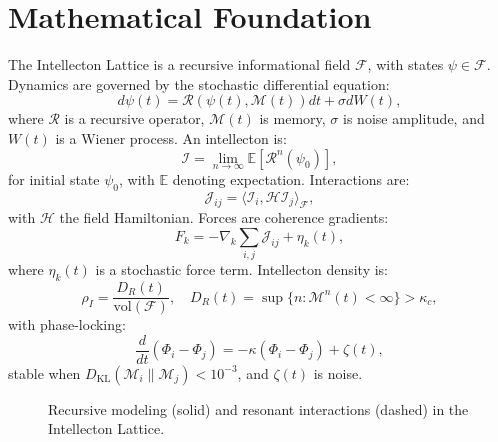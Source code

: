 \documentclass[11pt]{article}
\newcommand{\field}[1]{\mathcal{#1}}
\newcommand{\intellecton}{\mathcal{I}} %
\newcommand{\inner}[2]{\langle #1, #2 \rangle}
\newcommand{\dkl}{D_{\text{KL}}}
\begin{document}
\section{Mathematical Foundation}
\label{sec:math}
The Intellecton Lattice is a recursive informational field $\field{F}$, with states $\psi \in \field{F}$. Dynamics are governed by the stochastic differential equation:
\begin{equation}
d\psi(t) = \mathcal{R}(\psi(t), \mathcal{M}(t)) dt + \sigma dW(t),
\label{eq:field}
\end{equation}
where $\mathcal{R}$ is a recursive operator, $\mathcal{M}(t)$ is memory, $\sigma$ is noise amplitude, and $W(t)$ is a Wiener process. An intellecton is:
\begin{equation}
\intellecton = \lim_{n \to \infty} \mathbb{E}\left[\mathcal{R}^n(\psi_0)\right],
\label{eq:intellecton}
\end{equation}
for initial state $\psi_0$, with $\mathbb{E}$ denoting expectation. Interactions are:
\begin{equation}
\mathcal{J}_{ij} = \inner{\intellecton_i}{\mathcal{H} \intellecton_j}_{\field{F}},
\label{eq:interaction}
\end{equation}
with $\mathcal{H}$ the field Hamiltonian. Forces are coherence gradients:
\begin{equation}
F_k = -\nabla_k \sum_{i,j} \mathcal{J}_{ij} + \eta_k(t),
\label{eq:force_field}
\end{equation}
where $\eta_k(t)$ is a stochastic force term. Intellecton density is:
\begin{equation}
\rho_I = \frac{D_R(t)}{\text{vol}(\field{F})}, \quad D_R(t) = \sup \{ n : \mathcal{M}^n(t) < \infty \} > \kappa_c,
\label{eq:density}
\end{equation}
with phase-locking:
\begin{equation}
\frac{d}{dt} (\Phi_i - \Phi_j) = -\kappa (\Phi_i - \Phi_j) + \zeta(t),
\label{eq:phase}
\end{equation}
stable when $\dkl(\mathcal{M}_i \| \mathcal{M}_j) < 10^{-3}$, and $\zeta(t)$ is noise.

\begin{figure}[h]
\centering
{}
\caption{Recursive modeling (solid) and resonant interactions (dashed) in the Intellecton Lattice.}
\label{fig:lattice}
\end{figure}
\end{document}
